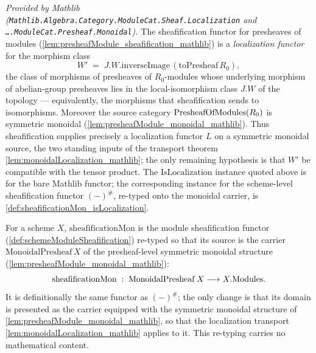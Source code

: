 \begin{lemma}
  \label{lem:moduleSheafification_isLocalization_mathlib}
  \mathlibok
  \textit{Provided by Mathlib
  (\texttt{Mathlib.Algebra.Category.ModuleCat.Sheaf.Localization} and
  \texttt{\ldots.ModuleCat.Presheaf.Monoidal}).}
  The sheafification functor for presheaves of modules
  (\cref{lem:presheafModule_sheafification_mathlib}) is a \emph{localization
  functor} for the morphism class
  \[
    W' \;=\; J.W.\mathrm{inverseImage}\,(\mathrm{toPresheaf}\,R_0),
  \]
  the class of morphisms of presheaves of \(R_0\)-modules whose underlying
  morphism of abelian-group presheaves lies in the local-isomorphism class
  \(J.W\) of the topology --- equivalently, the morphisms that sheafification
  sends to isomorphisms. Moreover the source category \(\mathrm{PresheafOfModules}(R_0)\) is
  symmetric monoidal (\cref{lem:presheafModule_monoidal_mathlib}). Thus
  sheafification supplies precisely a localization functor \(L\) on a symmetric
  monoidal source, the two standing inputs of the transport theorem
  \cref{lem:monoidalLocalization_mathlib}; the only remaining hypothesis is that
  \(W'\) be compatible with the tensor product. The \(\mathrm{IsLocalization}\)
  instance quoted above is for the bare Mathlib functor; the corresponding
  instance for the scheme-level sheafification functor
  \(\mathbf{(-)}^{\#}\), re-typed onto the monoidal carrier, is
  \cref{def:sheafificationMon_isLocalization}.
\end{lemma}

\begin{definition}\leanok
  \label{def:sheafificationMon}
  For a scheme \(X\), \(\mathrm{sheafificationMon}\) is the module sheafification
  functor (\cref{def:schemeModuleSheafification}) re-typed so that its source is
  the carrier \(\mathrm{MonoidalPresheaf}\,X\) of the presheaf-level symmetric
  monoidal structure (\cref{lem:presheafModule_monoidal_mathlib}):
  \[
    \mathrm{sheafificationMon} \;:\;
      \mathrm{MonoidalPresheaf}\,X \longrightarrow X.\mathrm{Modules} .
  \]
  It is definitionally the same functor as \((-)^{\#}\); the only change is that
  its domain is presented as the carrier equipped with the symmetric monoidal
  structure of \cref{lem:presheafModule_monoidal_mathlib}, so that the localization
  transport \cref{lem:monoidalLocalization_mathlib} applies to it. This re-typing
  carries no mathematical content.
\end{definition}

